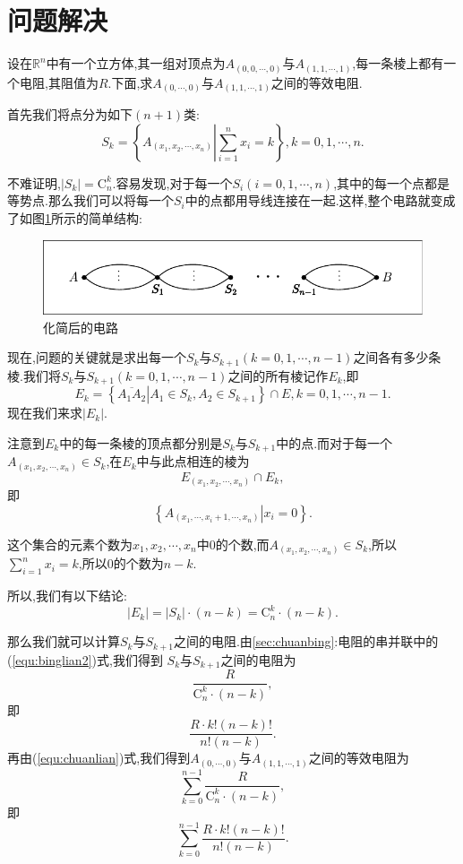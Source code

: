 \documentclass[10.5pt]{article}
\begin{document}
\section{问题解决}
设在$\mathbb{R}^n$中有一个立方体,其一组对顶点为$A_{(0,0,\cdots,0)}$与$A_{(1,1,\cdots,1)}$,每一条棱上都有一个电阻,其阻值为$R$.下面,求$A_{(0,\cdots,0)}$与$A_{(1,1,\cdots,1)}$之间的等效电阻.
\par 首先我们将点分为如下$(n+1)$类:
\[S_k=\left\{A_{(x_1,x_2,\cdots,x_n)}\left|\sum\limits_{i=1}^nx_i=k\right.\right\},k=0,1,\cdots,n.\]
\par 不难证明,$\left|S_k\right|=\mathrm{C}_n^k$.容易发现,对于每一个$S_i(i=0,1,\cdots,n)$,其中的每一个点都是等势点.那么我们可以将每一个$S_i$中的点都用导线连接在一起.这样,整个电路就变成了如图\ref{fig:simpler}所示的简单结构:
\begin{figure}[h]
	\centering
	\includegraphics{Figure4.pdf}
	\caption{化简后的电路}
	\label{fig:simpler}
\end{figure}
\par 现在,问题的关键就是求出每一个$S_k$与$S_{k+1}(k=0,1,\cdots,n-1)$之间各有多少条 棱.我们将$S_k$与$S_{k+1}(k=0,1,\cdots,n-1)$之间的所有棱记作$E_k$,即
\[E_k=\left\{\left.\overline{A_1A_2}\right|A_1\in S_k,A_2\in S_{k+1}\right\}\cap E,k=0,1,\cdots,n-1.\]
现在我们来求$\left|E_k\right|$.
\par 注意到$E_k$中的每一条棱的顶点都分别是$S_k$与$S_{k+1}$中的点.而对于每一个 $A_{(x_1,x_2,\cdots,x_n)}\in S_k$,在$E_k$中与此点相连的棱为
\[E_{(x_1,x_2,\cdots,x_n)}\cap E_k,\]
即
\[\left\{\left. A_{(x_1,\cdots,x_i+1,\cdots,x_n)}\right|x_i=0\right\}.\]
\par 这个集合的元素个数为$x_1,x_2,\cdots,x_n$中0的个数,而$A_{(x_1,x_2,\cdots, x_n)}\in S_k$,所以$\sum\limits_{i=1}^nx_i=k$,所以0的个数为$n-k$.
\par 所以,我们有以下结论:
\[|E_k|=|S_k|\cdot(n-k)=\mathrm{C}_n^k\cdot(n-k).\]
\par   那么我们就可以计算$S_k$与$S_{k+1}$之间的电阻.由\ref{sec:chuanbing}:电阻的串并联中的(\ref{equ:binglian2})式,我们得到 $S_k$与$S_{k+1}$之间的电阻为
\[\frac{R}{\mathrm{C}_n^k\cdot(n-k)},\]
即
\[\frac{R\cdot k!(n-k)!}{n!(n-k)}.\]
再由(\ref{equ:chuanlian})式,我们得到$A_{(0,\cdots,0)}$与$A_{(1,1,\cdots,1)}$之间的等效电阻为
\[\sum\limits_{k=0}^{n-1}\frac{R}{\mathrm{C}_n^k\cdot(n-k)},\]
即
\[\sum\limits_{k=0}^{n-1}\frac{R\cdot k!(n-k)!}{n!(n-k)}.\]
\end{document}
